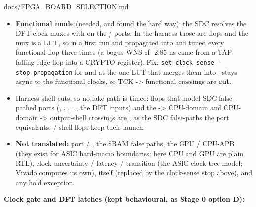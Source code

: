 \begin{relocated}{docs/FPGA_BOARD_SELECTION.md}
\begin{itemize}
   channel FIFOs (directions as in the check SDC:
  aw/w/ar written in the CPU domain, b/r the other way); the
   /   /
   level crossings and  (all bound,
  1-2 flops each);  to the 18 async set/clear pins
  of the  flops;  physically
  exclusive with the two functional clocks.
\item
  \textbf{Functional mode} (needed, and found the hard way): the SDC
  resolves the DFT clock muxes with  on the
   /  ports. In the harness those are
  flops and the mux is a LUT, so in a first run  and
   propagated into  and timed every
  functional flop three times (a bogus  WNS of -2.85 ns came
  from a TAP falling-edge flop into a CRYPTO register). Fix:
  \texttt{set\_\allowbreak{}clock\_\allowbreak{}sense\ -\allowbreak{}stop\_\allowbreak{}propagation}
  for  and  at the one LUT that merges them
  into ;  stays async to the functional
  clocks, so TCK -\textgreater{} functional crossings are \textbf{cut}.
\item
  Harness-shell cuts, so no fake path is timed:  flops that
  model SDC-false-pathed ports (, ,
  , , , the DFT inputs) and
  the  -\textgreater{} CPU-domain and CPU-domain
  -\textgreater{} output-shell crossings are , as
  the SDC false-paths the port equivalents.  /
   shell flops keep their  launch.
\item
  \textbf{Not translated:} port  /
  , the SRAM  false paths, the GPU /
  CPU-APB  (they exist for ASIC hard-macro
  boundaries; here CPU and GPU are plain RTL), clock uncertainty /
  latency / transition (the ASIC clock-tree model; Vivado computes its
  own),  itself (replaced by the clock-sense
  stop above), and any hold exception.
\end{itemize}

\textbf{Clock gate and DFT latches (kept behavioural, as Stage 0 option
D):}


\end{relocated}
